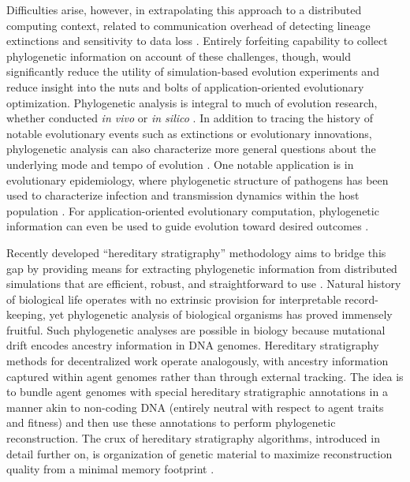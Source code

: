 Difficulties arise, however, in extrapolating this approach to a distributed computing context, related to communication overhead of detecting lineage extinctions and sensitivity to data loss \citep{moreno2024algorithms}.
Entirely forfeiting capability to collect phylogenetic information on account of these challenges, though, would significantly reduce the utility of simulation-based evolution experiments and reduce insight into the nuts and bolts of application-oriented evolutionary optimization.
Phylogenetic analysis is integral to much of evolution research, whether conducted \textit{in vivo} or \textit{in silico} \citep{faithConservationEvaluationPhylogenetic1992, STAMATAKIS2005phylogenetics,frenchHostPhylogenyShapes2023,kim2006discovery,lewinsohnStatedependentEvolutionaryModels2023a,lenski2003evolutionary}.
In addition to tracing the history of notable evolutionary events such as extinctions or evolutionary innovations, phylogenetic analysis can also characterize more general questions about the underlying mode and tempo of evolution \citep{moreno2023toward,hernandez2022can,shahbandegan2022untangling,lewinsohnStatedependentEvolutionaryModels2023a}.
One notable application is in evolutionary epidemiology, where phylogenetic structure of pathogens has been used to characterize infection and transmission dynamics within the host population \citep{giardina2017inference,voznica2022deep}.
For application-oriented evolutionary computation, phylogenetic information can even be used to guide evolution toward desired outcomes \citep{lalejini2024phylogeny,lalejini2024runtime,murphy2008simple,burke2003increased}.

Recently developed ``hereditary stratigraphy'' methodology aims to bridge this gap by providing means for extracting phylogenetic information from distributed simulations that are efficient, robust, and straightforward to use \citep{moreno2022hereditary}.
Natural history of biological life operates with no extrinsic provision for interpretable record-keeping, yet phylogenetic analysis of biological organisms has proved immensely fruitful.
Such phylogenetic analyses are possible in biology because mutational drift encodes ancestry information in DNA genomes.
Hereditary stratigraphy methods for decentralized work operate analogously, with ancestry information captured within agent genomes rather than through external tracking.
The idea is to bundle agent genomes with special hereditary stratigraphic annotations in a manner akin to non-coding DNA (entirely neutral with respect to agent traits and fitness) and then use these annotations to perform phylogenetic reconstruction.
The crux of hereditary stratigraphy algorithms, introduced in detail further on, is organization of genetic material to maximize reconstruction quality from a minimal memory footprint \citep{moreno2022hereditary}.

